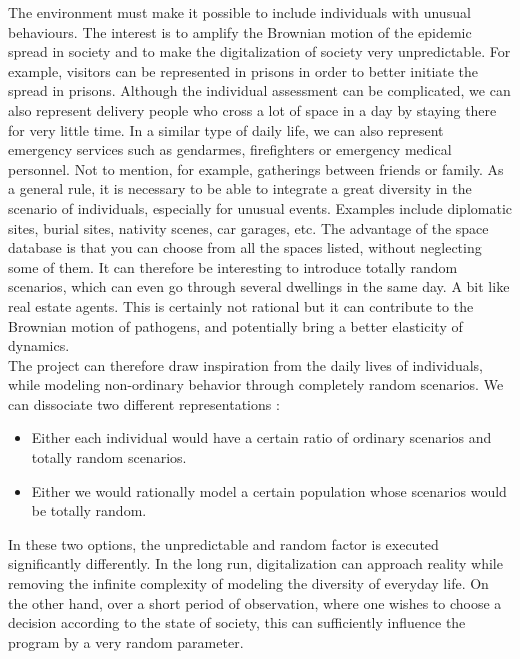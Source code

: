 The environment must make it possible to include individuals with unusual behaviours. The interest is to amplify the Brownian motion of the epidemic spread in society and to make the digitalization of society very unpredictable. For example, visitors can be represented in prisons in order to better initiate the spread in prisons. Although the individual assessment can be complicated, we can also represent delivery people who cross a lot of space in a day by staying there for very little time. In a similar type of daily life, we can also represent emergency services such as gendarmes, firefighters or emergency medical personnel. Not to mention, for example, gatherings between friends or family. As a general rule, it is necessary to be able to integrate a great diversity in the scenario of individuals, especially for unusual events. Examples include diplomatic sites, burial sites, nativity scenes, car garages, etc. The advantage of the space database is that you can choose from all the spaces listed, without neglecting some of them. It can therefore be interesting to introduce totally random scenarios, which can even go through several dwellings in the same day. A bit like real estate agents. This is certainly not rational but it can contribute to the Brownian motion of pathogens, and potentially bring a better elasticity of dynamics.\\

The project can therefore draw inspiration from the daily lives of individuals, while modeling non-ordinary behavior through completely random scenarios. We can dissociate two different representations :\\

\begin{itemize}
\item Either each individual would have a certain ratio of ordinary scenarios and totally random scenarios.
\item Either we would rationally model a certain population whose scenarios would be totally random.\\
\end{itemize}

In these two options, the unpredictable and random factor is executed significantly differently. In the long run, digitalization can approach reality while removing the infinite complexity of modeling the diversity of everyday life. On the other hand, over a short period of observation, where one wishes to choose a decision according to the state of society, this can sufficiently influence the program by a very random parameter.\\

